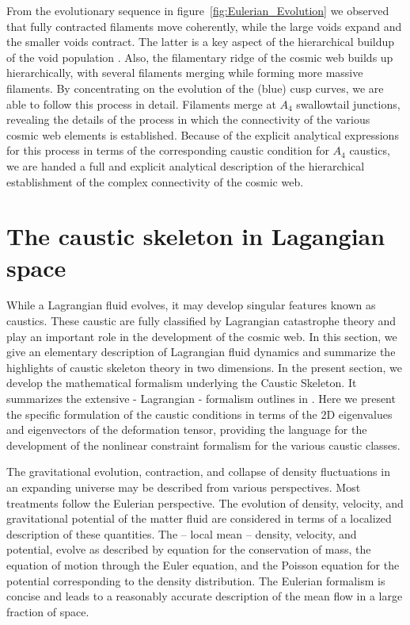 \documentclass[a4paper, 11pt]{article}
\begin{document}
From the evolutionary sequence in figure~\ref{fig:Eulerian_Evolution} we observed that fully contracted filaments move coherently, while the large voids expand and the smaller voids contract. The latter is a key aspect of the hierarchical buildup of the void population \cite[see][]{Sheth:2004}. Also, the filamentary ridge of the cosmic web builds up hierarchically, with several filaments merging while forming more massive filaments. By concentrating on the evolution of the (blue) cusp curves, we are able to follow this process in detail. Filaments merge at $A_4$ swallowtail junctions, revealing the details of the process in which the connectivity of the various cosmic web elements is established. Because of the explicit analytical expressions for this process in terms of the corresponding caustic condition for $A_4$ caustics, we are handed a full and explicit analytical description of the hierarchical establishment of the complex connectivity of the cosmic web.

\section{The caustic skeleton in Lagangian space}\label{sec:Caustic_Skeleton_Theory}
While a Lagrangian fluid evolves, it may develop singular features known as caustics. These caustic are fully classified by Lagrangian catastrophe theory and play an important role in the development of the cosmic web. In this section, we give an elementary description of Lagrangian fluid dynamics and summarize the highlights of caustic skeleton theory in two dimensions. In the present section, we develop the mathematical formalism underlying the Caustic Skeleton. It summarizes the extensive - Lagrangian - formalism outlines in \cite{Feldbrugge:2018}. Here we present the specific formulation of the caustic conditions in terms of the 2D eigenvalues and eigenvectors of the deformation tensor, providing the language for the development of the nonlinear constraint formalism for the various caustic classes.

The gravitational evolution, contraction, and collapse of density fluctuations in an expanding universe may be described from various perspectives. Most treatments follow the Eulerian perspective. The evolution of density, velocity, and gravitational potential of the matter fluid are considered in terms of a localized description of these quantities. The -- local mean -- density, velocity, and potential, evolve as described by equation for the conservation of mass, the equation of motion through the Euler equation, and the Poisson equation for the potential corresponding to the density distribution. The Eulerian formalism is concise and leads to a reasonably accurate description of the mean flow in a large fraction of space.
\end{document}

